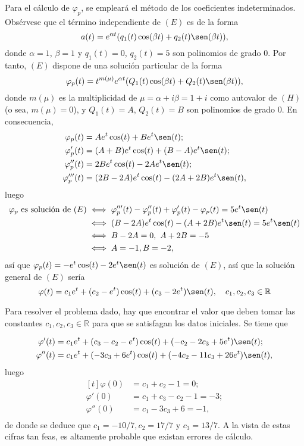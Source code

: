 \documentclass[11pt]{report}
\newcommand{\R}{\mathbb R}
\begin{document}
Para el cálculo de $\varphi_p$, se empleará el método de los coeficientes indeterminados. Obsérvese que el término independiente de $(E)$ es de la forma
\[a(t)=e^{\alpha t}(q_1(t)\cos(\beta t)+q_2(t)\sen(\beta t)),\]
donde $\alpha=1$, $\beta =1$ y $q_1(t)=0$, $q_2(t)=5$ son polinomios de grado $0$. Por tanto, $(E)$ dispone de una solución particular de la forma
\[\varphi_p(t)=t^{m(\mu)}e^{\alpha t}(Q_1(t)\cos(\beta t)+Q_2(t)\sen(\beta t)),\]
donde $m(\mu)$ es la multiplicidad de $\mu=\alpha+i\beta = 1+i$ como autovalor de $(H)$ (o sea, $m(\mu) =0$), y $Q_1(t)=A$, $Q_2(t)=B$ son polinomios de grado $0$. En consecuencia,
\[\begin{aligned}[t]
    \varphi_p(t)&=Ae^t\cos(t)+Be^t\sen(t); \\
    \varphi_p'(t)&=(A+B)e^t\cos(t)+(B-A)e^t\sen(t); \\
    \varphi_p''(t)&= 2Be^t\cos(t)-2Ae^t\sen(t); \\
    \varphi_p'''(t)&=(2B-2A)e^t\cos(t)-(2A+2B)e^t\sen(t),
\end{aligned}\]
luego
\[
\begin{aligned}[t]
    \varphi_p \textup{ es solución de } (E) &\iff \varphi_p'''(t)-\varphi_p''(t)+\varphi_p'(t)-\varphi_p(t)=5e^t\sen(t) \\ 
    &\iff (B-2A)e^t\cos(t)-(A+2B)e^t\sen(t)=5e^t\sen(t) \\
    &\iff B-2A=0, \ A+2B=-5 \\
    &\iff A=-1, B=-2,
\end{aligned}
\]
así que $\varphi_p(t)=-e^t\cos(t)-2e^t\sen(t)$ es solución de $(E)$, así que la solución general de $(E)$ sería
\[\varphi(t)=c_1e^t+(c_2-e^t)\cos(t)+(c_3-2e^t)\sen(t), \quad c_1,c_2,c_3\in \R\]

Para resolver el problema dado, hay que encontrar el valor que deben tomar las constantes $c_1,c_2,c_3 \in \R$ para que se satisfagan los datos iniciales. Se tiene que

\[
\begin{aligned}[t]
    \varphi'(t)&=c_1e^t+(c_3-c_2-e^t)\cos(t)+(-c_2-2c_3+5e^t)\sen(t); \\
    \varphi''(t)&=c_1e^t+(-3c_3+6e^t)\cos(t)+(-4c_2-11c_3+26e^t)\sen(t), \\
\end{aligned}
\]
luego
\[
\begin{aligned}[t]
    \varphi(0)&=c_1+c_2-1=0; \\
    \varphi'(0)&=c_1+c_3-c_2-1=-3; \\
    \varphi''(0)&=c_1-3c_3+6=-1, \\
\end{aligned}
\]
de donde se deduce que $c_1=-10/7 ,c_2=17/7 $ y $c_3 =13/7$. A la vista de estas cifras tan feas, es altamente probable que existan errores de cálculo.
\end{document}
